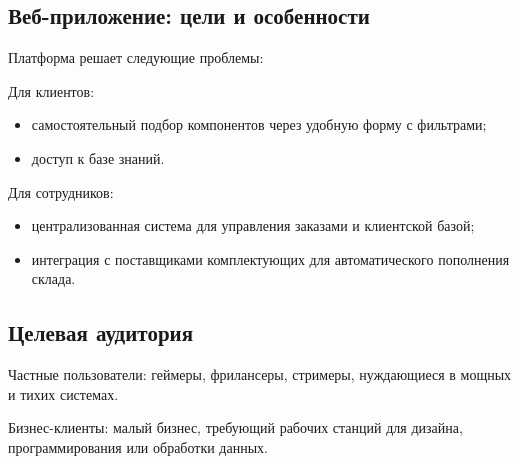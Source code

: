\subsection{Веб-приложение: цели и особенности}
Платформа решает следующие проблемы:

Для клиентов:
\begin{itemize}
	\item самостоятельный подбор компонентов через удобную форму с фильтрами;
	\item доступ к базе знаний.
\end{itemize}

Для сотрудников:
\begin{itemize}
	\item централизованная система для управления заказами и клиентской базой;
	\item интеграция с поставщиками комплектующих для автоматического пополнения склада.
\end{itemize}

\subsection{Целевая аудитория}
Частные пользователи: геймеры, фрилансеры, стримеры, нуждающиеся в мощных и тихих системах.

Бизнес-клиенты: малый бизнес, требующий рабочих станций для дизайна, программирования или обработки данных.













